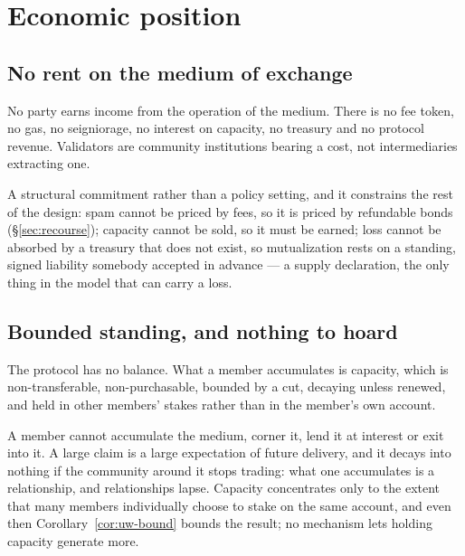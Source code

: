 \section{Economic position}
\label{sec:economics}

\subsection{No rent on the medium of exchange}

\begin{property}
\label{prop:no-rent}
No party earns income from the operation of the medium. There is no fee token, no gas,
no seigniorage, no interest on capacity, no treasury and no protocol revenue. Validators
are community institutions bearing a cost, not intermediaries extracting one.
\end{property}

A structural commitment rather than a policy setting, and it constrains the rest of the
design: spam cannot be priced by fees, so it is priced by refundable bonds
(\S\ref{sec:recourse}); capacity cannot be sold, so it must be earned; loss cannot be
absorbed by a treasury that does not exist, so mutualization rests on a standing, signed
liability somebody accepted in advance --- a supply declaration, the only thing in the
model that can carry a loss.

\subsection{Bounded standing, and nothing to hoard}

\begin{property}
\label{prop:no-hoard}
The protocol has no balance. What a member accumulates is capacity, which is
non-transferable, non-purchasable, bounded by a cut, decaying unless renewed, and held
in other members' stakes rather than in the member's own account.
\end{property}

A member cannot accumulate the medium, corner it, lend it at interest or exit into it. A
large claim is a large expectation of future delivery, and it decays into nothing if the
community around it stops trading: what one accumulates is a relationship, and
relationships lapse. Capacity concentrates only to the extent that many members
individually choose to stake on the same account, and even then
Corollary~\ref{cor:uw-bound} bounds the result; no mechanism lets holding capacity
generate more.

